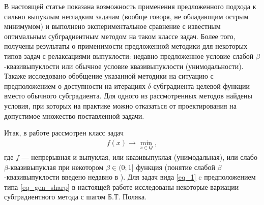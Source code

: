     В настоящей статье показана возможность применения предложенного подхода к сильно выпуклым негладким задачам (вообще говоря, не обладающим острым минимумом) и выполнено экспериментальное сравнение с известным оптимальным субградиентным методом на таком классе задач. Более того, получены результаты о применимости предложенной методики для некоторых типов задач с релаксациями выпуклости: недавно предложенное условие слабой $\beta$-квазивыпуклости \cite{7} или обычное условие квазивыпуклости (унимодальности). Такаже исследовано обобщение указанной методики на ситуацию с предположением о доступности на итерациях $\delta$-субградиента целевой функции вместо обычного субградиента. Для одного из рассмотренных методов найдены условия, при которых на практике можно отказаться от проектирования на допустимое множество поставленной задачи.

    Итак, в работе рассмотрен класс задач
    \begin{gather}\label{eq_1}
    f(x)\rightarrow\min_{x\in Q},
    \end{gather}
    где $f$ --- непрерывная и выпуклая, или квазивыпуклая (унимодальная), или слабо $\beta$-квазивыпуклая при некотором $\beta\in (0;1]$ функция (понятие слабой $\beta$-квазивыпуклости введено недавно в \cite{7}). Для задач вида \eqref{eq_1} c предположением типа \eqref{eq_gen_sharp} в настоящей работе исследованы некоторые вариации субградиентного метода с шагом Б.Т. Поляка.

